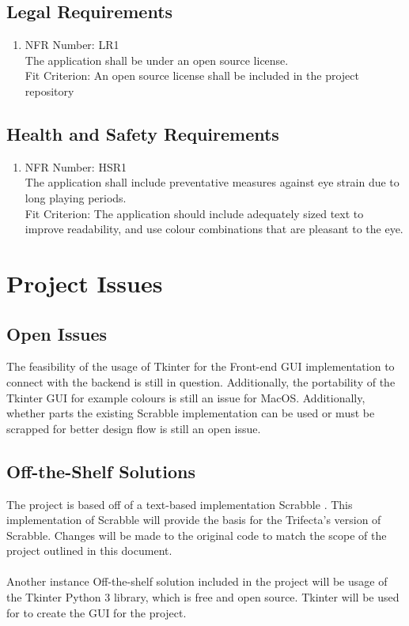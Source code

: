 \documentclass[12pt, titlepage]{article}
\begin{document}
\subsection{Legal Requirements}
\begin{enumerate}
    \item NFR Number: LR1 \\
    The application shall be under an open source license. \\
    Fit Criterion: An open source license shall be included in the project repository
\end{enumerate}

\subsection{Health and Safety Requirements} 
\begin{enumerate}
    \item NFR Number: HSR1\\
    The application shall include preventative measures against eye strain due to long playing periods.\\ 
    Fit Criterion: The application should include adequately sized text to improve readability, and use colour combinations that are pleasant to the eye. 
\end{enumerate}

\section{Project Issues}

\subsection{Open Issues}%
%
The feasibility of the usage of Tkinter for the Front-end GUI implementation to connect with the backend is still in question. Additionally, the portability of the Tkinter GUI for example colours is still an issue for MacOS. Additionally, whether parts the existing Scrabble implementation can be used or must be scrapped for better design flow is still an open issue.


\subsection{Off-the-Shelf Solutions}
The project is based off of a text-based implementation Scrabble \cite{fayrose_2019}. This implementation of Scrabble will provide the basis for the Trifecta's version of Scrabble. Changes will be made to the original code to match the scope of the project outlined in this document.\\ \\
Another instance Off-the-shelf solution included in the project will be usage of the Tkinter Python 3 library, which is free and open source. Tkinter will be used for to create the GUI for the project.
\end{document}
